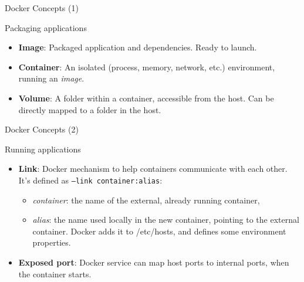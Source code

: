 \documentclass[presentation]{beamer}
\begin{document}
{
\begin{frame}[label=sec-7-3]{Docker Concepts (1)}

\begin{block}{Packaging applications}

\begin{itemize}
\item \textbf{Image}: Packaged application and dependencies. Ready to launch.
\item \textbf{Container}: An isolated (process, memory, network, etc.) environment, running an \textit{image}.
\item \textbf{Volume}: A folder within a container, accessible from the host. Can be directly mapped to a folder in the host.
\end{itemize}
\end{block}
\end{frame}
} %

{
\begin{frame}[label=sec-7-4]{Docker Concepts (2)}

\begin{block}{Running applications}

\begin{itemize}
\item \textbf{Link}: Docker mechanism to help containers communicate with each other. It's defined as \texttt{--link container:alias}:
\begin{itemize}
\item \textit{container}: the name of the external, already running container,
\item \textit{alias}: the name used locally in the new container, pointing to the external container. Docker adds it to /etc/hosts, and defines some environment properties.
\end{itemize}
\item \textbf{Exposed port}: Docker service can map host ports to internal ports, when the container starts.
\end{itemize}
\end{block}
\end{frame}
} %
\end{document}
